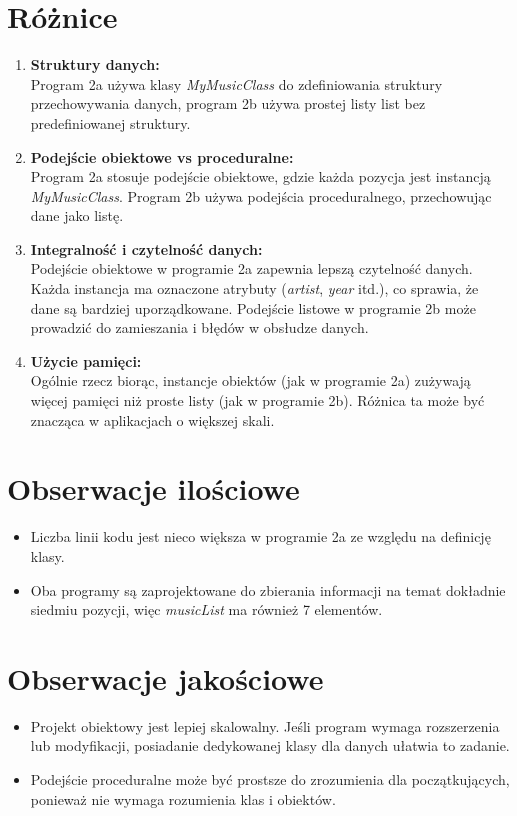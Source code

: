\documentclass{article}
\begin{document}
\section{Różnice}
\begin{enumerate}
    \item \textbf{Struktury danych:}\\Program 2a używa klasy \textit{MyMusicClass} do zdefiniowania struktury przechowywania danych, program 2b używa prostej listy list bez predefiniowanej struktury.
    \item \textbf{Podejście obiektowe vs proceduralne:}\\Program 2a stosuje podejście obiektowe, gdzie każda pozycja jest instancją \textit{MyMusicClass}. Program 2b używa podejścia proceduralnego, przechowując dane jako listę.
    \item \textbf{Integralność i czytelność danych:}\\Podejście obiektowe w programie 2a zapewnia lepszą czytelność danych. Każda instancja ma oznaczone atrybuty (\textit{artist}, \textit{year} itd.), co sprawia, że dane są bardziej uporządkowane. Podejście listowe w programie 2b może prowadzić do zamieszania i błędów w obsłudze danych.
    \item \textbf{Użycie pamięci:}\\Ogólnie rzecz biorąc, instancje obiektów (jak w programie 2a) zużywają więcej pamięci niż proste listy (jak w programie 2b). Różnica ta może być znacząca w aplikacjach o większej skali.
\end{enumerate}

\section{Obserwacje ilościowe}
\begin{itemize}
    \item Liczba linii kodu jest nieco większa w programie 2a ze względu na definicję klasy.
    \item Oba programy są zaprojektowane do zbierania informacji na temat dokładnie siedmiu pozycji, więc \textit{musicList} ma również 7 elementów.
\end{itemize}

\section{Obserwacje jakościowe}
\begin{itemize}
    \item Projekt obiektowy jest lepiej skalowalny. Jeśli program wymaga rozszerzenia lub modyfikacji, posiadanie dedykowanej klasy dla danych ułatwia to zadanie.
    \item Podejście proceduralne może być prostsze do zrozumienia dla początkujących, ponieważ nie wymaga rozumienia klas i obiektów.
\end{itemize}
\end{document}
